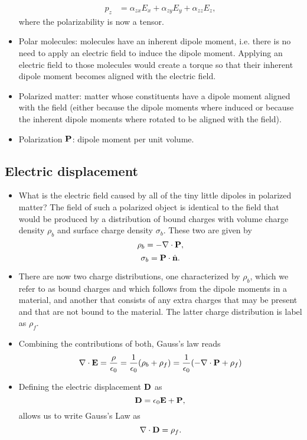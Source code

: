 \documentclass[11pt]{article}
\begin{document}
\begin{itemize}
\begin{align}
         p_z &= \alpha_{zx} E_x + \alpha_{zy} E_y + \alpha_{zz} E_z,
    \end{align}
    where the polarizability is now a tensor.
    \item Polar molecules: molecules have an inherent dipole moment, i.e. there is no need to apply an electric field to induce the dipole moment. Applying an electric field to those molecules would create a torque so that their inherent dipole moment becomes aligned with the electric field.
    \item Polarized matter: matter whose constituents have a dipole moment aligned with the field (either because the dipole moments where induced or because the inherent dipole moments where rotated to be aligned with the field).
    \item Polarization $\mathbf{P}$: dipole moment per unit volume.
\end{itemize}
\subsection{Electric displacement}
\begin{itemize}
    \item What is the electric field caused by all of the tiny little dipoles in polarized matter? The field of such a polarized object is identical to the field that would be produced by a distribution of bound charges with volume charge density $\rho_b$ and surface charge density $\sigma_b$. These two are given by 
    \begin{equation}
        \rho_b = - \nabla \cdot \mathbf{P},
    \end{equation}
    \begin{equation}
        \sigma_b = \mathbf{P} \cdot \hat{\mathbf{n}}.
    \end{equation}
    \item There are now two charge distributions, one characterized by $\rho_b$, which we refer to as bound charges and which follows from the dipole moments in a material, and another that consists of any extra charges that may be present and that are not bound to the material. The latter charge distribution is label as $\rho_f$.
    \item Combining the contributions of both, Gauss's law reads
    \begin{equation}
        \nabla \cdot \mathbf{E} = \frac{\rho}{\epsilon_0} = \frac{1}{\epsilon_0}(\rho_b + \rho_f) = \frac{1}{\epsilon_0} (-\nabla \cdot \mathbf{P} + \rho_f)
    \end{equation}
    \item Defining the electric displacement $\mathbf{D}$ as 
    \begin{equation}
        \mathbf{D} = \epsilon_0 \mathbf{E} + \mathbf{P},
    \end{equation}
    allows us to write Gauss's Law as 
    \begin{equation}
        \nabla \cdot \mathbf{D} = \rho_f.
    \end{equation}
\end{itemize}
\end{document}
